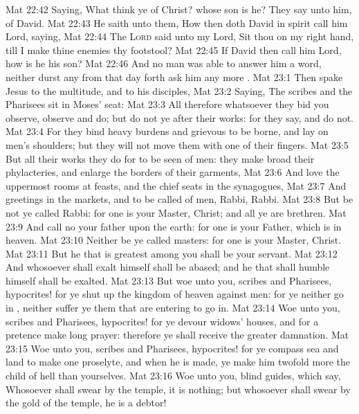 \vs Mat 22:42 Saying, What think ye of Christ? whose son is he? They say unto him,  of David.
\vs Mat 22:43 He saith unto them, How then doth David in spirit call him Lord, saying,
\vs Mat 22:44 The \textsc{Lord} said unto my Lord, Sit thou on my right hand, till I make thine enemies thy footstool?
\vs Mat 22:45 If David then call him Lord, how is he his son?
\vs Mat 22:46 And no man was able to answer him a word, neither durst any  from that day forth ask him any more .
\vs Mat 23:1 Then spake Jesus to the multitude, and to his disciples,
\vs Mat 23:2 Saying, The scribes and the Pharisees sit in Moses' seat:
\vs Mat 23:3 All therefore whatsoever they bid you observe,  observe and do; but do not ye after their works: for they say, and do not.
\vs Mat 23:4 For they bind heavy burdens and grievous to be borne, and lay  on men's shoulders; but they  will not move them with one of their fingers.
\vs Mat 23:5 But all their works they do for to be seen of men: they make broad their phylacteries, and enlarge the borders of their garments,
\vs Mat 23:6 And love the uppermost rooms at feasts, and the chief seats in the synagogues,
\vs Mat 23:7 And greetings in the markets, and to be called of men, Rabbi, Rabbi.
\vs Mat 23:8 But be not ye called Rabbi: for one is your Master,  Christ; and all ye are brethren.
\vs Mat 23:9 And call no  your father upon the earth: for one is your Father, which is in heaven.
\vs Mat 23:10 Neither be ye called masters: for one is your Master,  Christ.
\vs Mat 23:11 But he that is greatest among you shall be your servant.
\vs Mat 23:12 And whosoever shall exalt himself shall be abased; and he that shall humble himself shall be exalted.
\vs Mat 23:13 But woe unto you, scribes and Pharisees, hypocrites! for ye shut up the kingdom of heaven against men: for ye neither go in , neither suffer ye them that are entering to go in.
\vs Mat 23:14 Woe unto you, scribes and Pharisees, hypocrites! for ye devour widows' houses, and for a pretence make long prayer: therefore ye shall receive the greater damnation.
\vs Mat 23:15 Woe unto you, scribes and Pharisees, hypocrites! for ye compass sea and land to make one proselyte, and when he is made, ye make him twofold more the child of hell than yourselves.
\vs Mat 23:16 Woe unto you,  blind guides, which say, Whosoever shall swear by the temple, it is nothing; but whosoever shall swear by the gold of the temple, he is a debtor!
